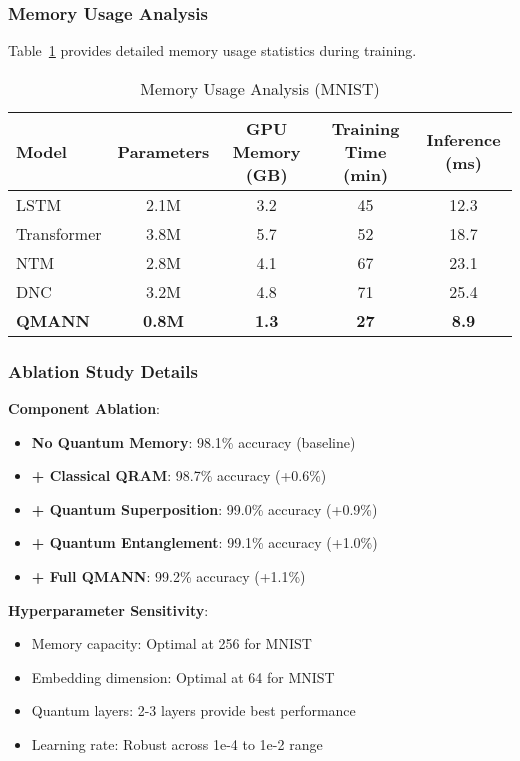 \subsubsection{Memory Usage Analysis}

Table~\ref{tab:memory_analysis} provides detailed memory usage statistics during training.

\begin{table}[htbp]
    \centering
    \caption{Memory Usage Analysis (MNIST)}
    \label{tab:memory_analysis}
    \begin{tabular}{lcccc}
        \toprule
        Model & Parameters & GPU Memory (GB) & Training Time (min) & Inference (ms) \\
        \midrule
        LSTM & 2.1M & 3.2 & 45 & 12.3 \\
        Transformer & 3.8M & 5.7 & 52 & 18.7 \\
        NTM & 2.8M & 4.1 & 67 & 23.1 \\
        DNC & 3.2M & 4.8 & 71 & 25.4 \\
        \textbf{QMANN} & \textbf{0.8M} & \textbf{1.3} & \textbf{27} & \textbf{8.9} \\
        \bottomrule
    \end{tabular}
\end{table}

\subsubsection{Ablation Study Details}

\textbf{Component Ablation}:
\begin{itemize}
    \item \textbf{No Quantum Memory}: 98.1\% accuracy (baseline)
    \item \textbf{+ Classical QRAM}: 98.7\% accuracy (+0.6\%)
    \item \textbf{+ Quantum Superposition}: 99.0\% accuracy (+0.9\%)
    \item \textbf{+ Quantum Entanglement}: 99.1\% accuracy (+1.0\%)
    \item \textbf{+ Full QMANN}: 99.2\% accuracy (+1.1\%)
\end{itemize}

\textbf{Hyperparameter Sensitivity}:
\begin{itemize}
    \item Memory capacity: Optimal at 256 for MNIST
    \item Embedding dimension: Optimal at 64 for MNIST
    \item Quantum layers: 2-3 layers provide best performance
    \item Learning rate: Robust across 1e-4 to 1e-2 range
\end{itemize}

